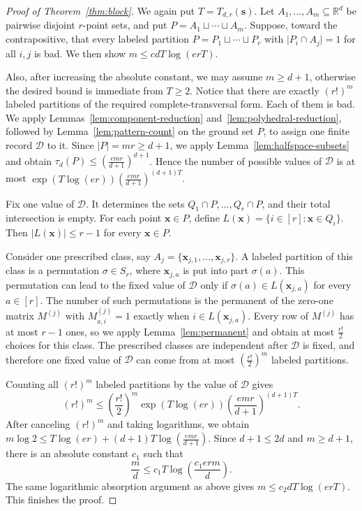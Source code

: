 \documentclass[11pt]{article}
\theoremstyle{definition}
\newcommand*{\abs}[1]{\lvert#1\rvert}
\newcommand{\R}{\mathbb{R}}
\begin{document}
\begin{proof}[Proof of Theorem~\ref{thm:block}]
We again put \(T=T_{d,r}(\boldsymbol{s})\). Let \(A_{1},\ldots,A_{m}\subseteq\R^{d}\) be pairwise disjoint \(r\)-point sets, and put \(P=A_{1}\sqcup\cdots\sqcup A_{m}\). Suppose, toward the contrapositive, that every labeled partition \(P=P_{1}\sqcup\cdots\sqcup P_{r}\) with \(\abs{P_{i}\cap A_{j}}=1\) for all \(i,j\) is bad. We then show \(m\le cdT\log(erT)\).

Also, after increasing the absolute constant, we may assume \(m\ge d+1\), otherwise the desired bound is immediate from \(T\ge 2\). Notice that there are exactly \((r!)^{m}\) labeled partitions of the required complete-transversal form. Each of them is bad. We apply Lemmas~\ref{lem:component-reduction} and~\ref{lem:polyhedral-reduction}, followed by Lemma~\ref{lem:pattern-count} on the ground set \(P\), to assign one finite record \(\mathcal{D}\) to it. Since \(\abs{P}=mr\ge d+1\), we apply Lemma~\ref{lem:halfspace-subsets} and obtain \(\tau_{d}(P)\le \left(\frac{emr}{d+1}\right)^{d+1}\). Hence the number of possible values of \(\mathcal{D}\) is at most \(\exp(T\log(er))\left(\frac{emr}{d+1}\right)^{(d+1)T}\).

Fix one value of \(\mathcal{D}\). It determines the sets \(Q_{1}\cap P,\ldots,Q_{r}\cap P\), and their total intersection is empty. For each point \(\boldsymbol{x}\in P\), define \(L(\boldsymbol{x})=\{i\in [r]:\boldsymbol{x}\in Q_{i}\}\). Then \(\abs{L(\boldsymbol{x})}\le r-1\) for every \(\boldsymbol{x}\in P\).

Consider one prescribed class, say \(A_{j}=\{\boldsymbol{x}_{j,1},\ldots,\boldsymbol{x}_{j,r}\}\). A labeled partition of this class is a permutation \(\sigma\in S_{r}\), where \(\boldsymbol{x}_{j,a}\) is put into part \(\sigma(a)\). This permutation can lead to the fixed value of \(\mathcal{D}\) only if \(\sigma(a)\in L(\boldsymbol{x}_{j,a})\) for every \(a\in [r]\). The number of such permutations is the permanent of the zero-one matrix \(M^{(j)}\) with \(M^{(j)}_{a,i}=1\) exactly when \(i\in L(\boldsymbol{x}_{j,a})\). Every row of \(M^{(j)}\) has at most \(r-1\) ones, so we apply Lemma~\ref{lem:permanent} and obtain at most \(\frac{r!}{2}\) choices for this class. The prescribed classes are independent after \(\mathcal{D}\) is fixed, and therefore one fixed value of \(\mathcal{D}\) can come from at most \((\frac{r!}{2})^{m}\) labeled partitions.

Counting all \((r!)^{m}\) labeled partitions by the value of \(\mathcal{D}\) gives
\[
(r!)^{m}\le \left(\frac{r!}{2}\right)^{m}\exp(T\log(er))\left(\frac{emr}{d+1}\right)^{(d+1)T}.
\]
After canceling \((r!)^{m}\) and taking logarithms, we obtain \(m\log 2\le T\log(er)+(d+1)T\log\left(\frac{emr}{d+1}\right)\). Since \(d+1\le 2d\) and \(m\ge d+1\), there is an absolute constant \(c_{1}\) such that
\[
\frac{m}{d}\le c_{1}T\log\left(\frac{c_{1}erm}{d}\right).
\]
The same logarithmic absorption argument as above gives \(m\le c_{2}dT\log(erT)\). This finishes the proof.
\end{proof}
\end{document}
